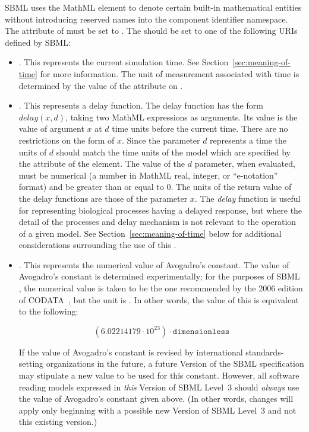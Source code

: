 SBML \thisL uses the MathML  element to denote
certain built-in mathematical entities without introducing
reserved names into the component identifier namespace.  The
 attribute of  must be set to
.  The  should be set to one of the
following URIs defined by SBML:
\begin{itemize}

\item {}.  This
  represents the current simulation time.  See
  Section~\ref{sec:meaning-of-time} for more information.  The
  unit of measurement associated with time is determined by the
  value of the  attribute on \Model.

\item {}.  This
  represents a delay function.  The delay function has the form
  $delay(x, d)$, taking two MathML expressions as arguments.  Its
  value is the value of argument $x$ at $d$ time units before the
  current time.  There are no restrictions on the form of $x$.
  Since the parameter $d$ represents a time the units of $d$ should
  match the time units of the model which are specified by the
  attribute  of the \Model element.  The value of
  the $d$ parameter, when evaluated, must be numerical (\ie a
  number in MathML real, integer, or ``e-notation'' format) and be
  greater than or equal to 0.  The units of the return value of the
  delay functions are those of the parameter $x$.  The \emph{delay}
  function is useful for representing biological processes having a
  delayed response, but where the detail of the processes and delay
  mechanism is not relevant to the operation of a given model.  See
  Section~\ref{sec:meaning-of-time} below for additional
  considerations surrounding the use of this .

\item {}.  This
  represents the numerical value of Avogadro's constant.  The
  value of Avogadro's constant is determined experimentally; for
  the purposes of SBML \thisLVnum, the numerical value is taken to
  be the one recommended by the 2006 edition of
  CODATA~\citep{codata_2008}, but the unit is
  .  In other words, the value of this
   is equivalent to the following:
  \begin{linenomath}
    \begin{equation*}
      (6.02214179 \cdot 10^{23}) \cdot \texttt{dimensionless}
    \end{equation*}
  \end{linenomath}
  If the value of Avogadro's constant is revised by international
  standards-setting organizations in the future, a future Version
  of the SBML \thisL specification may stipulate a new value to be
  used for this  constant.  However, all software
  reading models expressed in \emph{this} Version of SBML Level~3
  should \emph{always} use the value of Avogadro's constant given
  above.  (In other words, changes will apply only beginning with
  a possible new Version of SBML Level~3 and not this existing
  version.)


\end{itemize}
